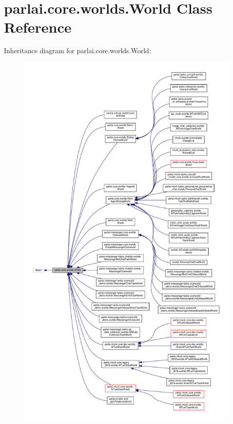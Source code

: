 \hypertarget{classparlai_1_1core_1_1worlds_1_1World}{}\section{parlai.\+core.\+worlds.\+World Class Reference}
\label{classparlai_1_1core_1_1worlds_1_1World}


Inheritance diagram for parlai.\+core.\+worlds.\+World\+:
\nopagebreak
\begin{figure}[H]
\begin{center}
\leavevmode
\includegraphics[height=550pt]{classparlai_1_1core_1_1worlds_1_1World__inherit__graph}
\end{center}
\end{figure}


